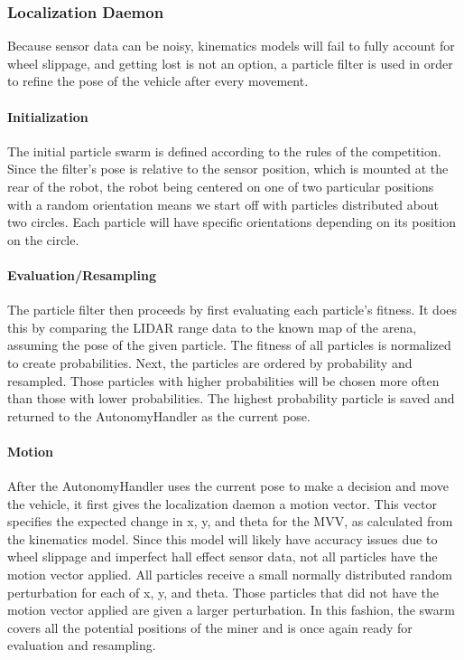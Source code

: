 \subsubsection{Localization Daemon}
Because sensor data can be noisy, kinematics models will fail to fully account for wheel slippage, and getting lost is not an option, a particle filter is used in order to refine the pose of the vehicle after every movement.
\paragraph{Initialization}
The initial particle swarm is defined according to the rules of the competition.  Since the filter's pose is relative to the sensor position, which is mounted at the rear of the robot, the robot being centered on one of two particular positions with a random orientation means we start off with particles distributed about two circles.  Each particle will have specific orientations depending on its position on the circle.
\paragraph{Evaluation/Resampling}
The particle filter then proceeds by first evaluating each particle's fitness.  It does this by comparing the LIDAR range data to the known map of the arena, assuming the pose of the given particle.  The fitness of all particles is normalized to create probabilities.  Next, the particles are ordered by probability and resampled.  Those particles with higher probabilities will be chosen more often than those with lower probabilities.  The highest probability particle is saved and returned to the AutonomyHandler as the current pose.
\paragraph{Motion}
After the AutonomyHandler uses the current pose to make a decision and move the vehicle, it first gives the localization daemon a motion vector.  This vector specifies the expected change in x, y, and theta for the MVV, as calculated from the kinematics model.  Since this model will likely have accuracy issues due to wheel slippage and imperfect hall effect sensor data, not all particles have the motion vector applied.  All particles receive a small normally distributed random perturbation for each of x, y, and theta.  Those particles that did not have the motion vector applied are given a larger perturbation.  In this fashion, the swarm covers all the potential positions of the miner and is once again ready for evaluation and resampling.
